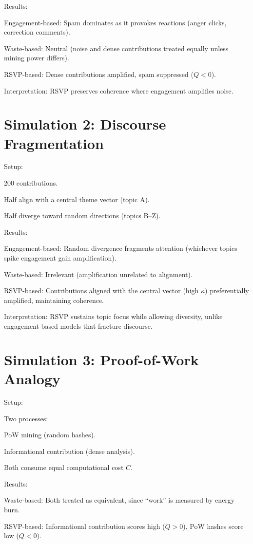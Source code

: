 \documentclass{book}
\begin{document}
Results:

Engagement-based: Spam dominates as it provokes reactions (anger clicks, correction comments).

Waste-based: Neutral (noise and dense contributions treated equally unless mining power differs).

RSVP-based: Dense contributions amplified, spam suppressed (\( Q < 0 \)).

Interpretation: RSVP preserves coherence where engagement amplifies noise.

\section{Simulation 2: Discourse Fragmentation}

Setup:

200 contributions.

Half align with a central theme vector (topic A).

Half diverge toward random directions (topics B–Z).

Results:

Engagement-based: Random divergence fragments attention (whichever topics spike engagement gain amplification).

Waste-based: Irrelevant (amplification unrelated to alignment).

RSVP-based: Contributions aligned with the central vector (high \( \kappa \)) preferentially amplified, maintaining coherence.

Interpretation: RSVP sustains topic focus while allowing diversity, unlike engagement-based models that fracture discourse.

\section{Simulation 3: Proof-of-Work Analogy}

Setup:

Two processes: 

PoW mining (random hashes).

Informational contribution (dense analysis).

Both consume equal computational cost \( C \).

Results:

Waste-based: Both treated as equivalent, since “work” is measured by energy burn.

RSVP-based: Informational contribution scores high (\( Q > 0 \)), PoW hashes score low (\( Q < 0 \)).
\end{document}
